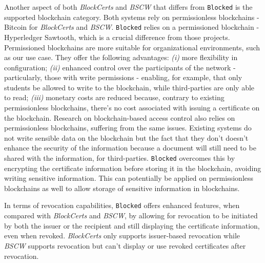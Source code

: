 Another aspect of both \emph{BlockCerts} and \emph{BSCW} that differs from \texttt{Blocked} is the supported blockchain category. Both systems rely on permissionless blockchains - Bitcoin for \emph{BlockCerts} and \emph{BSCW}. \texttt{Blocked} relies on a permissioned blockchain - Hyperledger Sawtooth, which is a crucial difference from those projects. Permissioned blockchains are more suitable for organizational environments, such as our use case. They offer the following advantages: \emph{(i)} more flexibility in configuration; \emph{(ii)} enhanced control over the participants of the network - particularly, those with write permissions - enabling, for example, that only students be allowed to write to the blockchain, while third-parties are only able to read; \emph{(iii)} monetary costs are reduced because, contrary to existing permissionless blockchains, there's no cost associated with issuing a certificate on the blockchain. Research on blockchain-based access control \cite{maesa_blockchain_2017} also relies on permissionless blockchains, suffering from the same issues. Existing systems do not write sensible data on the blockchain but the fact that they don't doesn't enhance the security of the information because a document will still need to be shared with the information, for third-parties. \texttt{Blocked} overcomes this by encrypting the certificate information before storing it in the blockchain, avoiding writing sensitive information. This can potentially be applied on permissionless blockchains as well to allow storage of sensitive information in blockchains.

In terms of revocation capabilities, \texttt{Blocked} offers enhanced features, when compared with \emph{BlockCerts} and \emph{BSCW}, by allowing for revocation to be initiated by both the issuer or the recipient and still displaying the certificate information, even when revoked. \emph{BlockCerts} only supports issuer-based revocation while \emph{BSCW} supports revocation but can't display or use revoked certificates after revocation.

